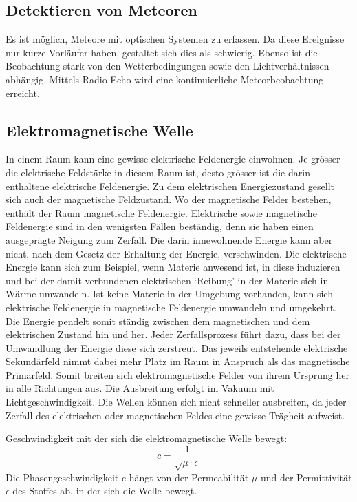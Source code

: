 \begin{refsection}
\section{Detektieren von Meteoren}

Es ist möglich, Meteore mit optischen Systemen zu erfassen. 
Da diese Ereignisse nur kurze Vorläufer haben, gestaltet sich dies als schwierig.
Ebenso ist die Beobachtung stark von den Wetterbedingungen sowie den Lichtverhältnissen abhängig.
Mittels Radio-Echo wird eine kontinuierliche Meteorbeobachtung erreicht. 

\subsection{Elektromagnetische Welle}
In einem Raum kann eine gewisse elektrische Feldenergie einwohnen.
Je grösser die elektrische Feldstärke in diesem Raum ist, desto grösser ist die darin enthaltene elektrische Feldenergie.
Zu dem elektrischen Energiezustand gesellt sich auch der magnetische Feldzustand.
Wo der magnetische Felder bestehen, enthält der Raum magnetische Feldenergie.
Elektrische sowie magnetische Feldenergie sind in den wenigsten Fällen beständig, denn sie haben einen ausgeprägte Neigung zum Zerfall.
Die darin innewohnende Energie kann aber nicht, nach dem Gesetz der Erhaltung der Energie, verschwinden.
Die elektrische Energie kann sich zum Beispiel, wenn Materie anwesend ist, in diese induzieren und bei der damit verbundenen elektrischen `Reibung' in der Materie sich in Wärme umwandeln.
Ist keine Materie in der Umgebung vorhanden, kann sich elektrische Feldenergie in magnetische Feldenergie umwandeln und umgekehrt. 
Die Energie pendelt somit ständig zwischen dem magnetischen und dem elektrischen Zustand hin und her.
Jeder Zerfallsprozess führt dazu, dass bei der Umwandlung der Energie diese sich zerstreut.
Das jeweils entstehende elektrische Sekundärfeld nimmt dabei mehr Platz im Raum in Anspruch als das magnetische Primärfeld.
Somit breiten sich elektromagnetische Felder von ihrem Ursprung her in alle Richtungen aus.
Die Ausbreitung erfolgt im Vakuum mit Lichtgeschwindigkeit.
Die Wellen können sich nicht schneller ausbreiten, da jeder Zerfall des elektrischen oder magnetischen Feldes eine gewisse Trägheit aufweist\cite{buch:meinke}.

Geschwindigkeit mit der sich die elektromagnetische Welle bewegt:
\[
c
=
\frac{1}{\sqrt{\mu\cdot\epsilon}}
\]
Die Phasengeschwindigkeit c hängt von der Permeabilität $\mu$ und der Permittivität $\epsilon$ des Stoffes ab, in der sich die Welle bewegt.


\end{refsection}
